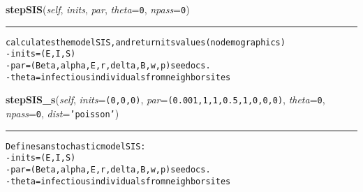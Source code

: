     \vspace{0.5ex}

    \begin{boxedminipage}{\textwidth}

    \raggedright \textbf{stepSIS}(\textit{self}, \textit{inits}, \textit{par}, \textit{theta}=\texttt{0}, \textit{npass}=\texttt{0})

    \vspace{-1.5ex}

    \rule{\textwidth}{0.5\fboxrule}
\begin{alltt}

calculates the model SIS, and return its values (no demographics)
- inits = (E,I,S)
- par = (Beta, alpha, E,r,delta,B, w, p) see docs.
- theta = infectious individuals from neighbor sites
\end{alltt}

    \vspace{1ex}

    \end{boxedminipage}

    \label{Epigrass:simobj:popmodels:stepSIS_s}

    \vspace{0.5ex}

    \begin{boxedminipage}{\textwidth}

    \raggedright \textbf{stepSIS\_s}(\textit{self}, \textit{inits}=\texttt{(0,0,0)}, \textit{par}=\texttt{(0.001,1,1,0.5,1,0,0,0)}, \textit{theta}=\texttt{0}, \textit{npass}=\texttt{0}, \textit{dist}=\texttt{'poisson'})

    \vspace{-1.5ex}

    \rule{\textwidth}{0.5\fboxrule}
\begin{alltt}

Defines an stochastic model SIS:
- inits = (E,I,S)
- par = (Beta, alpha, E,r,delta,B,w,p) see docs.
- theta = infectious individuals from neighbor sites
\end{alltt}

    \vspace{1ex}

    \end{boxedminipage}

    \label{Epigrass:simobj:popmodels:stepSIR}

